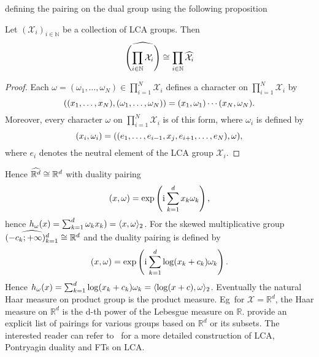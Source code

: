 defining the pairing on the dual group using the following
proposition~\citep{folland1994course}
\begin{proposition}
    Let $(\mathcal{X}_i)_{i\in\mathbb{N}}$ be a collection of \ac{LCA} groups.
    Then
    \begin{dmath*}
        \dual{\left(\prod_{i\in\mathbb{N}} \mathcal{X}_i\right)} \cong
        \prod_{i\in\mathbb{N}} \dual{\mathcal{X}_i}
    \end{dmath*}
\end{proposition}
\begin{proof}
    Each $\omega=(\omega_1, \hdots, \omega_N)\in\prod_{i=1}^N\mathcal{X}_i$
    defines a character on $\prod_{i=1}^N\mathcal{X}_i$ by
    \begin{dmath*}
        \pairing{(x_1, \hdots, x_N),(\omega_1, \hdots,
        \omega_N)}=\pairing{x_1,\omega_1}\cdots\pairing{x_N,\omega_N}.
    \end{dmath*}
    Moreover, every character $\omega$ on $\prod_{i=1}^N\mathcal{X}_i$ is of
    this form, where $\omega_i$ is defined by
    \begin{dmath*}
        \pairing{x_i,\omega_i}=\pairing{(e_1, \hdots, e_{i-1}, x_j, e_{i+1},
        \hdots, e_N), \omega},
    \end{dmath*}
    where $e_i$ denotes the neutral element of the \ac{LCA} group
    $\mathcal{X}_i$.
\end{proof}
Hence $\widehat{\mathbb{R}^d}\cong\mathbb{R}^d$ with duality pairing
\begin{dmath*}
    \pairing{x,\omega}=\exp\left(\iu\sum_{k=1}^d x_k\omega_k \right),
\end{dmath*}
hence $h_\omega(x)=\sum_{k=1}^d\omega_k x_k)=\langle x,\omega\rangle_2$. For the
skewed multiplicative group $\widehat{(-c_k;+\infty)_{k=1}^d}\cong\mathbb{R}^d$
and the duality pairing is defined by
\begin{dmath*}
    \label{eq:pairing-skewed} \pairing{x, \omega} =
    \exp\left(\iu\sum_{k=1}^d\log(x_k+c_k)\omega_k\right).
\end{dmath*}
Hence $h_\omega(x)=\sum_{k=1}^d
\log(x_k+c_k)\omega_k=\langle\log(x+c),\omega\rangle_2$. Eventually the natural Haar
measure on product group is the product measure. \acs{Eg}~for
$\mathcal{X}=\mathbb{R}^d$, the Haar measure on $\mathbb{R}^d$ is the d-th
power of the Lebesgue measure on $\mathbb{R}$. 
provide an explicit list of pairings for various groups based on $\mathbb{R}^d$
or its subsets. The interested reader can refer to~\citet{folland1994course}
for a more detailed construction of \ac{LCA}, Pontryagin duality and \acl{FT}s
on \ac{LCA}.

